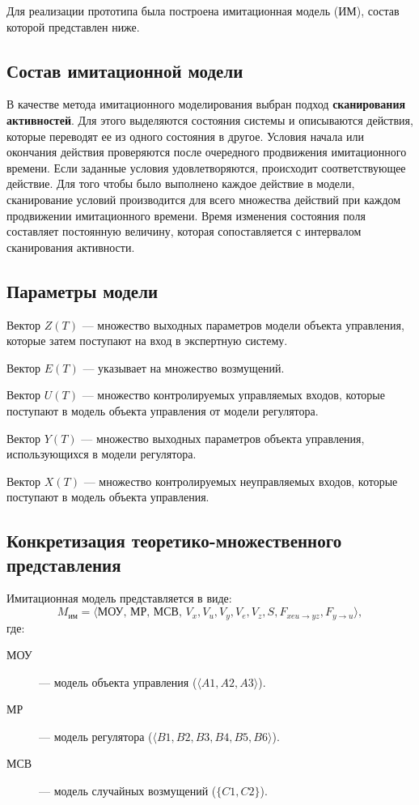 Для реализации прототипа была построена имитационная модель (ИМ), состав которой представлен ниже.

\subsection{Состав имитационной модели}

В качестве метода имитационного моделирования выбран подход \textbf{сканирования активностей}. Для этого выделяются состояния системы и описываются действия, которые переводят ее из одного состояния в другое. Условия начала или окончания действия проверяются после очередного продвижения имитационного времени. Если заданные условия удовлетворяются, происходит соответствующее действие. Для того чтобы было выполнено каждое действие в модели, сканирование условий производится для всего множества действий при каждом продвижении имитационного времени. Время изменения состояния поля составляет постоянную величину, которая сопоставляется с интервалом сканирования активности.

\subsection{Параметры модели}

Вектор $Z(T)$ --- множество выходных параметров модели объекта управления, которые затем поступают на вход в экспертную систему.

Вектор $E(T)$ --- указывает на множество возмущений.

Вектор $U(T)$ --- множество контролируемых управляемых входов, которые поступают в модель объекта управления от модели регулятора.

Вектор $Y(T)$ --- множество выходных параметров объекта управления, использующихся в модели регулятора.

Вектор $X(T)$ --- множество контролируемых неуправляемых входов, которые поступают в модель объекта управления.

\subsection{Конкретизация теоретико-множественного представления}

Имитационная модель представляется в виде:
\[M_{\text{им}} = \langle \text{МОУ, МР, МСВ, } V_x, V_u, V_y, V_e, V_z, S, F_{xeu \to yz}, F_{y \to u} \rangle,\]
где:

\begin{description}
    \item[МОУ] --- модель объекта управления ($\langle A1, A2, A3 \rangle$).
    \item[МР] --- модель регулятора ($\langle B1, B2, B3, B4, B5, B6 \rangle$).
    \item[МСВ] --- модель случайных возмущений ($\{C1, C2\}$).
\end{description}

